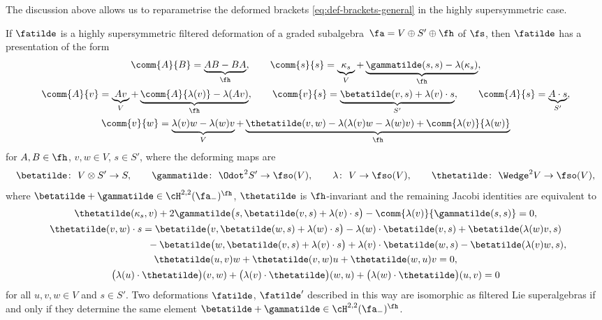 The discussion above allows us to reparametrise the deformed brackets \eqref{eq:def-brackets-general} in the highly supersymmetric case.

\begin{Proposition}\label{prop:filtered-def-high-susy}
	If $\fatilde$ is a highly supersymmetric filtered deformation of a graded subalgebra~${\fa=V\oplus S'\oplus \fh}$ of $\fs$, then $\fatilde$ has a presentation of the form
	\begin{gather}
		\comm{A}{B} = \underbrace{AB-BA}_\fh,\qquad
		\comm{s}{s} = \underbrace{\kappa_s}_V + \underbrace{\gammatilde(s,s) - \lambda(\kappa_s)}_\fh,\nonumber\\
		\comm{A}{v} = \underbrace{Av}_V + \underbrace{\comm{A}{\lambda(v)} - \lambda(Av)}_\fh,\qquad
		\comm{v}{s} = \underbrace{\betatilde(v,s) + \lambda(v)\cdot s}_{S'},\qquad
		\comm{A}{s} = \underbrace{A\cdot s}_{S'},\nonumber
	\\
		\comm{v}{w} = \underbrace{\lambda(v)w-\lambda(w)v}_V + \underbrace{\thetatilde(v,w) - \lambda(\lambda(v)w-\lambda(w)v) + \comm{\lambda(v)}{\lambda(w)}}_\fh\label{eq:def-brackets-V}
	\end{gather}
	for $A,B\in\fh$, $v,w\in V$, $s\in S'$, where the deforming maps are
	\[
\betatilde\colon\ V\otimes S' \to S,\qquad
		\gammatilde\colon\ \Odot^2 S' \to \fso(V),\qquad
		\lambda\colon\ V\to\fso(V),\qquad
		\thetatilde\colon\ \Wedge^2 V \to \fso(V),
	\]
	where $\betatilde+\gammatilde\in\cH^{2,2}(\fa_-)^\fh$, $\thetatilde$ is $\fh$-invariant and the remaining Jacobi identities are equivalent to
	\begin{gather}
		\thetatilde(\kappa_s,v) + 2\gammatilde\bigl(s,\betatilde(v,s)+\lambda(v)\cdot s\bigr) - \comm{\lambda(v)}{\gammatilde(s,s)} = 0, \label{eq:tilde-theta-kappa}\\
		\thetatilde(v,w)\cdot s
		= \betatilde\bigl(v,\betatilde(w,s)+\lambda(w)\cdot s\bigr)
			- \lambda(w)\cdot \betatilde(v,s) + \betatilde(\lambda(w)v,s)\nonumber\\
			\phantom{\thetatilde(v,w)\cdot s
		=}{} - \betatilde\bigl(w,\betatilde(v,s)+\lambda(v)\cdot s\bigr)
			+ \lambda(v)\cdot \betatilde(w,s) - \betatilde(\lambda(v)w,s),\label{eq:tilde-theta-lambda}\\
		\thetatilde(u,v)w + \thetatilde(v,w)u + \thetatilde(w,u)v =0,\label{eq:tilde-theta-bianchi}\\
		\bigl(\lambda(u)\cdot\thetatilde\bigr)(v,w) + \bigl(\lambda(v)\cdot\thetatilde\bigr)(w,u) +			\bigl(\lambda(w)\cdot\thetatilde\bigr)(u,v) = 0 \label{eq:tilde-theta-lambda-bianchi}
	\end{gather}
	for all $u,v,w\in V$ and $s\in S'$.
	Two deformations $\fatilde$, $\fatilde'$ described in this way are isomorphic as filtered Lie superalgebras if and only if they determine the same element $\betatilde+\gammatilde\in\cH^{2,2}(\fa_-)^\fh$.
\end{Proposition}

